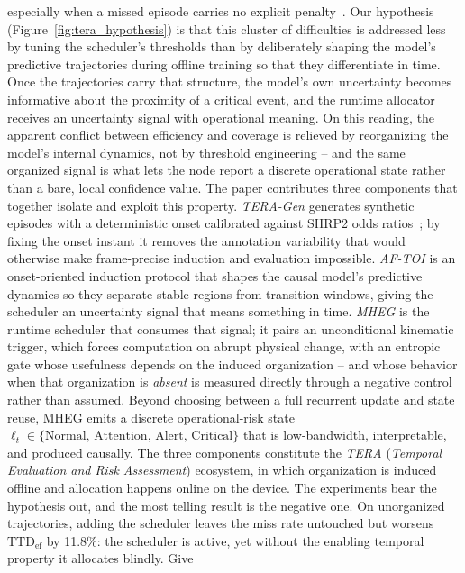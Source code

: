 \documentclass[a4paper,fleqn]{cas-dc}
\begin{document}
especially when a missed episode carries no explicit
penalty~\cite{dingus2016shrp2,fang2022dada,ortega2020dmd}.
Our hypothesis (Figure~\ref{fig:tera_hypothesis}) is that this cluster of
difficulties is addressed less by tuning the scheduler's thresholds than by
deliberately shaping the model's predictive trajectories during offline training so
that they differentiate in time. Once the trajectories carry that structure, the model's own uncertainty becomes informative about the proximity of a critical event, and the runtime allocator receives an uncertainty signal with operational meaning. On this reading, the apparent conflict
between efficiency and coverage is relieved by reorganizing the model's internal
dynamics, not by threshold engineering -- and the same organized signal is what lets
the node report a discrete operational state rather than a bare, local confidence
value.
The paper contributes three components that together isolate and exploit this
property. \textit{TERA-Gen} generates synthetic episodes with a deterministic
onset calibrated against SHRP2 odds ratios~\cite{dingus2016shrp2}; by fixing the
onset instant it removes the annotation variability that would otherwise make
frame-precise induction and evaluation impossible. \textit{AF-TOI} is an
onset-oriented induction protocol that shapes the causal model's predictive
dynamics so they separate stable regions from transition windows, giving the
scheduler an uncertainty signal that means something in time. \textit{MHEG} is
the runtime scheduler that consumes that signal; it pairs an unconditional
kinematic trigger, which forces computation on abrupt physical change, with an
entropic gate whose usefulness depends on the induced organization -- and whose
behavior when that organization is \emph{absent} is measured directly through a
negative control rather than assumed. Beyond choosing between a full recurrent
update and state reuse, \mbox{MHEG} emits a discrete operational-risk state
$\ell_t \in \{\text{Normal},\, \text{Attention},\, \text{Alert},\, \text{Critical}\}$
that is low-bandwidth, interpretable, and produced causally. The three components
constitute the \textit{TERA} (\textit{Temporal Evaluation and Risk Assessment})
ecosystem, in which organization is induced offline and allocation happens online
on the device.
The experiments bear the hypothesis out, and the most telling result is the
negative one. On unorganized trajectories, adding the scheduler leaves the miss
rate untouched but worsens $\mathrm{TTD}_{\mathrm{ef}}$ by 11.8\%: the scheduler
is active, yet without the enabling temporal property it allocates blindly. Give
\end{document}
